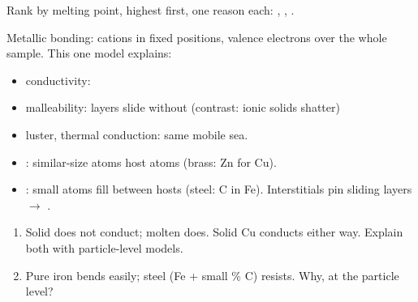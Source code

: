 \documentclass{apchem-notes}
\begin{document}
Rank by melting point, highest first, one reason each: , ,
.



Metallic bonding: cations in fixed positions, valence electrons
 over the whole sample. This one model explains:

\begin{itemize}[leftmargin=*,itemsep=0.25em]
  \item conductivity: 
  \item malleability: layers slide without
         (contrast: ionic solids
        shatter)
  \item luster, thermal conduction: same mobile sea.
\end{itemize}


\begin{itemize}[leftmargin=*,itemsep=0.25em]
  \item {}: similar-size atoms 
        host atoms (brass: Zn for Cu).
  \item {}: small atoms fill 
        between hosts (steel: C in Fe). Interstitials pin sliding layers
        $\to$ .
\end{itemize}


\begin{enumerate}[leftmargin=*,itemsep=0.4em]
  \item Solid  does not conduct; molten  does. Solid Cu
        conducts either way. Explain both with particle-level models.
  \item Pure iron bends easily; steel (Fe + small \% C) resists. Why, at the
        particle level? 
\end{enumerate}
\end{document}
